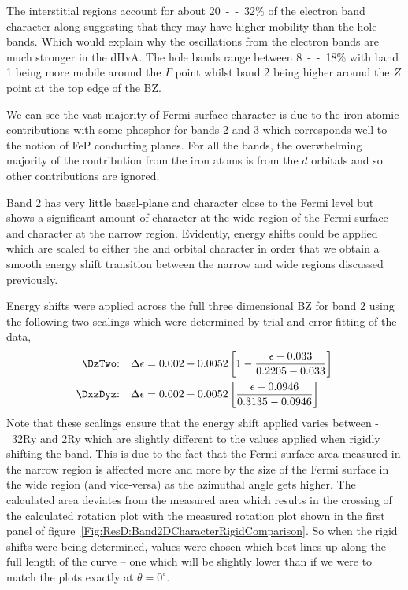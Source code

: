 The interstitial regions account for about \unit{20--32}{\%} of the electron band character along suggesting that they may have higher mobility than the hole bands. Which would explain why the oscillations from the electron bands are much stronger in the \ac{dHvA}. The hole bands range between \unit{8--18}{\%} with band 1 being more mobile around the $\Gamma$ point whilst band 2 being higher around the $Z$ point at the top edge of the \ac{BZ}.

We can see the vast majority of Fermi surface character is due to the iron atomic contributions with some phosphor for bands 2 and 3 which corresponds well to the notion of FeP conducting planes. For all the bands, the overwhelming majority of the contribution from the iron atoms is from the $d$ orbitals and so other contributions are ignored.

Band $2$ has very little basel-plane \Dxy and \DxTwoyTwo character close to the Fermi level but shows a significant amount of \DzTwo character at the wide region of the Fermi surface and \DxzDyz character at the narrow region. Evidently, energy shifts could be applied which are scaled to either the \DzTwo and \DxzDyz orbital character in order that we obtain a smooth energy shift transition between the narrow and wide regions discussed previously. 

Energy shifts were applied across the full three dimensional \ac{BZ} for band $2$ using the following two scalings which were determined by trial and error fitting of the data,
\begin{align*}
\textrm{\DzTwo:}\quad \Delta\epsilon &= 0.002 - 0.0052 \left[1 - \frac{\epsilon - 0.033}{0.2205 - 0.033}\right] \\
\textrm{\DxzDyz:}\quad \Delta\epsilon &= 0.002 - 0.0052 \left[\frac{\epsilon - 0.0946}{0.3135 - 0.0946}\right]
\end{align*}
Note that these scalings ensure that the energy shift applied varies between \unit{-32}{\milli\textrm{Ry}} and \unit{2}{\milli\textrm{Ry}} which are slightly different to the values applied when rigidly shifting the band. This is due to the fact that the Fermi surface area measured in the narrow region is affected more and more by the size of the Fermi surface in the wide region (and vice-versa) as the azimuthal angle gets higher. The calculated area deviates from the measured area which results in the crossing of the calculated rotation plot with the measured rotation plot shown in the first panel of figure~\ref{Fig:ResD:Band2DCharacterRigidComparison}. So when the rigid shifts were being determined, values were chosen which best lines up along the full length of the curve -- one which will be slightly lower than if we were to match the plots exactly at $\theta=0^\circ$.

